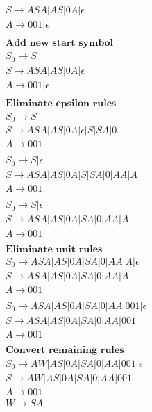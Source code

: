 \documentclass{article}
\begin{document}
\begin{align*}
   & S \rightarrow ASA|AS|0A|\epsilon \\
   & A \rightarrow 001|\epsilon \\\\
   & \textbf{Add new start symbol}\\
   & S_0 \rightarrow S \\
   & S \rightarrow ASA|AS|0A|\epsilon \\
   & A \rightarrow 001|\epsilon \\\\
   & \textbf{Eliminate epsilon rules}\\
   & S_0 \rightarrow S \\
   & S \rightarrow ASA|AS|0A|\epsilon|S|SA|0 \\
   & A \rightarrow 001 \\\\
   & S_0 \rightarrow S|\epsilon \\
   & S \rightarrow ASA|AS|0A|S|SA|0|AA|A \\
   & A \rightarrow 001 \\\\
   & S_0 \rightarrow S|\epsilon \\
   & S \rightarrow ASA|AS|0A|SA|0|AA|A \\
   & A \rightarrow 001 \\\\
   & \textbf{Eliminate unit rules}\\
   & S_0 \rightarrow ASA|AS|0A|SA|0|AA|A|\epsilon \\
   & S \rightarrow ASA|AS|0A|SA|0|AA|A \\
   & A \rightarrow 001 \\\\
   & S_0 \rightarrow ASA|AS|0A|SA|0|AA|001|\epsilon \\
   & S \rightarrow ASA|AS|0A|SA|0|AA|001 \\
   & A \rightarrow 001 \\\\
   & \textbf{Convert remaining rules}\\
   & S_0 \rightarrow AW|AS|0A|SA|0|AA|001|\epsilon \\
   & S \rightarrow AW|AS|0A|SA|0|AA|001 \\
   & A \rightarrow 001 \\ 
   & W \rightarrow SA \\\\
\end{align*}
\end{document}
